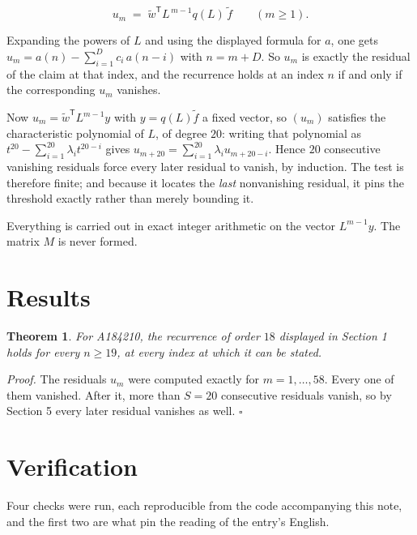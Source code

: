 \documentclass[11pt]{article}
\newtheorem{theorem}{Theorem}
\theoremstyle{definition}
\begin{document}
\[u_m \;=\; \tilde w^{\mathsf T} L^{\,m-1} q(L)\,\tilde f \qquad (m \ge 1).\]

Expanding the powers of $L$ and using the displayed formula for $a$, one gets $u_m = a(n) - \sum_{i=1}^{D} c_i\,a(n-i)$ with $n = m + D$. So $u_m$ is exactly the residual of the claim at that index, and the recurrence holds at an index $n$ if and only if the corresponding $u_m$ vanishes.

Now $u_m = \tilde w^{\mathsf T} L^{m-1} y$ with $y = q(L)\tilde f$ a fixed vector, so $(u_m)$ satisfies the characteristic polynomial of $L$, of degree $20$: writing that polynomial as $t^{20} - \sum_{i=1}^{20} \lambda_i t^{20-i}$ gives $u_{m+20} = \sum_{i=1}^{20} \lambda_i u_{m+20-i}$. Hence $20$ consecutive vanishing residuals force every later residual to vanish, by induction. The test is therefore finite; and because it locates the {\itshape last} nonvanishing residual, it pins the threshold exactly rather than merely bounding it.

Everything is carried out in exact integer arithmetic on the vector $L^{m-1}y$. The matrix $M$ is never formed.

\section{Results}

\begin{theorem} For A184210, the recurrence of order $18$ displayed in Section 1 holds for every $n \ge 19$, at every index at which it can be stated.\end{theorem}

{\itshape Proof.} The residuals $u_m$ were computed exactly for $m = 1,\dots,58$. Every one of them vanished. After it, more than $S = 20$ consecutive residuals vanish, so by Section 5 every later residual vanishes as well. $\square$

\section{Verification}

Four checks were run, each reproducible from the code accompanying this note, and the first two are what pin the reading of the entry's English.
\end{document}
